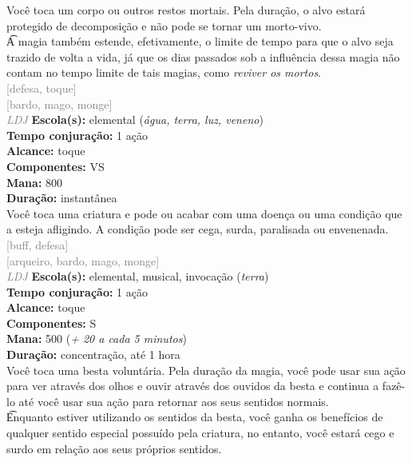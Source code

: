 \documentclass{RPG_Adventure}[2021/10/20]
\begin{document}
{\normalsize Você toca um corpo ou outros restos mortais. Pela duração, o alvo estará protegido de decomposição e não pode se tornar um morto-vivo.\\\t A magia também estende, efetivamente, o limite de tempo para que o alvo seja trazido de volta a vida, já que os dias passados sob a influência dessa magia não contam no tempo limite de tais magias, como \textit{reviver os mortos}.\\}
{\scriptsize \textcolor{gray}{[defesa, toque]\\}}
{\scriptsize \textcolor{gray}{[bardo, mago, monge]\\}}
{\tiny \textcolor{gray}{\textit{LDJ}}}
{\small \t \textbf{Escola(s):} elemental (\textit{água, terra, luz, veneno})\\\t \textbf{Tempo conjuração:} 1 ação\\\t \textbf{Alcance:} toque\\\t \textbf{Componentes:} VS\\\t \textbf{Mana:} 800\\\t \textbf{Duração:} instantânea\\}
{\normalsize Você toca uma criatura e pode ou acabar com uma doença ou uma condição que a esteja afligindo. A condição pode ser cega, surda, paralisada ou envenenada.\\}
{\scriptsize \textcolor{gray}{[buff, defesa]\\}}
{\scriptsize \textcolor{gray}{[arqueiro, bardo, mago, monge]\\}}
{\tiny \textcolor{gray}{\textit{LDJ}}}
{\small \t \textbf{Escola(s):} elemental, musical, invocação (\textit{terra})\\\t \textbf{Tempo conjuração:} 1 ação\\\t \textbf{Alcance:} toque\\\t \textbf{Componentes:} S\\\t \textbf{Mana:} 500 (\textit{+ 20 a cada 5 minutos})\\\t \textbf{Duração:} concentração, até 1 hora\\}
{\normalsize Você toca uma besta voluntária. Pela duração da magia, você pode usar sua ação para ver através dos olhos e ouvir através dos ouvidos da besta e continua a fazê-lo até você usar sua ação para retornar aos seus sentidos normais.\\\t Enquanto estiver utilizando os sentidos da besta, você ganha os benefícios de qualquer sentido especial possuído pela criatura, no entanto, você estará cego e surdo em relação aos seus próprios sentidos.\\}
\end{document}
